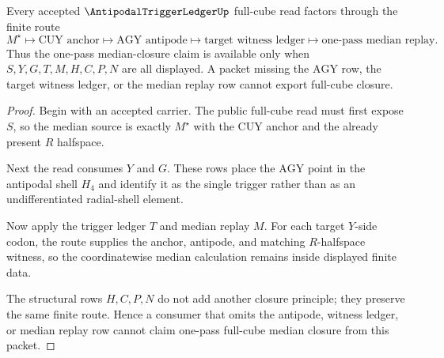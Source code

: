 \begin{theorem}
\label{thm:antipodal-trigger-ledger-median-nonescape}
Every accepted $\AntipodalTriggerLedgerUp$ full-cube read factors through the finite route
$$
M^{\star}
\longmapsto
\mathrm{CUY}\text{ anchor}
\longmapsto
\mathrm{AGY}\text{ antipode}
\longmapsto
\text{target witness ledger}
\longmapsto
\text{one-pass median replay}.
$$
Thus the one-pass median-closure claim is available only when $S,Y,G,T,M,H,C,P,N$ are all displayed. A packet missing the $\mathrm{AGY}$ row, the target witness ledger, or the median replay row cannot export full-cube closure.
\end{theorem}
\begin{proof}
Begin with an accepted carrier. The public full-cube read must first expose $S$, so the median source is exactly $M^{\star}$ with the $\mathrm{CUY}$ anchor and the already present $R$ halfspace.

Next the read consumes $Y$ and $G$. These rows place the $\mathrm{AGY}$ point in the antipodal shell $H_{4}$ and identify it as the single trigger rather than as an undifferentiated radial-shell element.

Now apply the trigger ledger $T$ and median replay $M$. For each target $Y$-side codon, the route supplies the anchor, antipode, and matching $R$-halfspace witness, so the coordinatewise median calculation remains inside displayed finite data.

The structural rows $H,C,P,N$ do not add another closure principle; they preserve the same finite route. Hence a consumer that omits the antipode, witness ledger, or median replay row cannot claim one-pass full-cube median closure from this packet.
\end{proof}

\begin{closurestatus}{\AntipodalTriggerLedgerUp}
  \theoryclosure{\seedClosure}
  \formalstatus{\unformalizedV}
\end{closurestatus}
